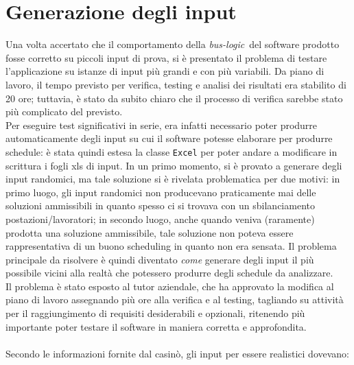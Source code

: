 \section{Generazione degli input}
Una volta accertato che il comportamento della \emph{\gls{bus-logic}}\glsfirstoccur\ del software prodotto fosse corretto su piccoli input di prova, si è presentato il problema di testare l'applicazione su istanze di input più grandi e con più variabili. Da piano di lavoro, il tempo previsto per verifica, testing e analisi dei risultati era stabilito di 20 ore; tuttavia, è stato da subito chiaro che il processo di verifica sarebbe stato più complicato del previsto.\\
Per eseguire test significativi in serie, era infatti necessario poter produrre automaticamente degli input su cui il software potesse elaborare per produrre schedule: è stata quindi estesa la classe \texttt{Excel} per poter andare a modificare in scrittura i fogli xls di input. In un primo momento, si è provato a generare degli input randomici, ma tale soluzione si è rivelata problematica per due motivi: in primo luogo, gli input randomici non producevano praticamente mai delle soluzioni ammissibili in quanto spesso ci si trovava con un sbilanciamento postazioni/lavoratori; in secondo luogo, anche quando veniva (raramente) prodotta una soluzione ammissibile, tale soluzione non poteva essere rappresentativa di un buono scheduling in quanto non era sensata. Il problema principale da risolvere è quindi diventato \textit{come} generare degli input il più possibile vicini alla realtà che potessero produrre degli schedule da analizzare.\\
Il problema è stato esposto al tutor aziendale, che ha approvato la modifica al piano di lavoro assegnando più ore alla verifica e al testing, tagliando su attività per il raggiungimento di requisiti desiderabili e opzionali, ritenendo più importante poter testare il software in maniera corretta e approfondita. \\
\\
Secondo le informazioni fornite dal casinò, gli input per essere realistici dovevano:
